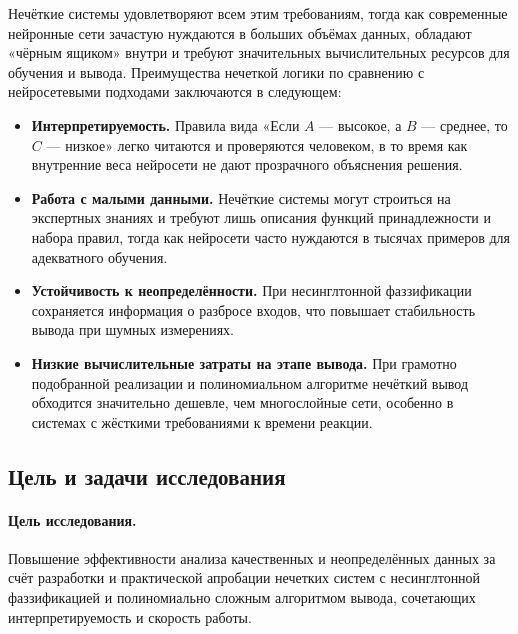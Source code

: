 Нечёткие системы удовлетворяют всем этим требованиям, тогда как современные нейронные сети зачастую нуждаются в больших объёмах данных, обладают «чёрным ящиком» внутри и требуют значительных вычислительных ресурсов для обучения и вывода. Преимущества нечеткой логики по сравнению с нейросетевыми подходами заключаются в следующем:
\begin{itemize}
  \item \textbf{Интерпретируемость.} Правила вида «Если $A$ — высокое, а $B$ — среднее, то $C$ — низкое» легко читаются и проверяются человеком, в то время как внутренние веса нейросети не дают прозрачного объяснения решения.
  \item \textbf{Работа с малыми данными.} Нечёткие системы могут строиться на экспертных знаниях и требуют лишь описания функций принадлежности и набора правил, тогда как нейросети часто нуждаются в тысячах примеров для адекватного обучения.
  \item \textbf{Устойчивость к неопределённости.} При несинглтонной фаззификации сохраняется информация о разбросе входов, что повышает стабильность вывода при шумных измерениях.
  \item \textbf{Низкие вычислительные затраты на этапе вывода.} При грамотно подобранной реализации и полиномиальном алгоритме нечёткий вывод обходится значительно дешевле, чем многослойные сети, особенно в системах с жёсткими требованиями к времени реакции.
\end{itemize}

\subsection{Цель и задачи исследования}

\paragraph{Цель исследования.} Повышение эффективности анализа качественных и неопределённых данных за счёт разработки и практической апробации нечетких систем с несинглтонной фаззификацией и полиномиально сложным алгоритмом вывода, сочетающих интерпретируемость и скорость работы.

